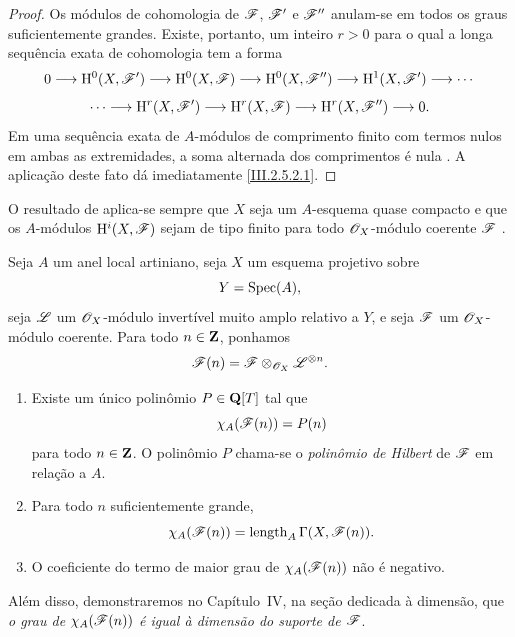 \begin{proof}
Os módulos de cohomologia de $\mathscr{F}$, $\mathscr{F}'$ e $\mathscr{F}''$ anulam-se em todos os graus suficientemente grandes.
Existe, portanto, um inteiro $r>0$ para o qual a longa sequência exata de cohomologia tem a forma
\[
  0\longrightarrow\mathrm{H}^0(X,\mathscr{F}')
  \longrightarrow\mathrm{H}^0(X,\mathscr{F})
  \longrightarrow\mathrm{H}^0(X,\mathscr{F}'')
  \longrightarrow\mathrm{H}^1(X,\mathscr{F}')
  \longrightarrow\cdots
\]
\[
  \cdots\longrightarrow\mathrm{H}^r(X,\mathscr{F}')
  \longrightarrow\mathrm{H}^r(X,\mathscr{F})
  \longrightarrow\mathrm{H}^r(X,\mathscr{F}'')
  \longrightarrow0.
\]
Em uma sequência exata de $A$-módulos de comprimento finito com termos nulos em ambas as extremidades, a soma alternada dos comprimentos é nula .
A aplicação deste fato dá imediatamente \eqref{III.2.5.2.1}.
\end{proof}

O resultado de  aplica-se sempre que $X$ seja um $A$-esquema quase compacto e que os $A$-módulos $\mathrm{H}^i(X,\mathscr{F})$ sejam de tipo finito para todo $\mathscr{O}_X$-módulo coerente $\mathscr{F}$ .

\begin{theorem}[2.5.3]
\label{III.2.5.3}
Seja $A$ um anel local artiniano, seja $X$ um esquema projetivo sobre
\[
  Y=\operatorname{Spec}(A),
\]
seja $\mathscr{L}$ um $\mathscr{O}_X$-módulo invertível muito amplo relativo a $Y$, e seja $\mathscr{F}$ um $\mathscr{O}_X$-módulo coerente.
Para todo $n\in\mathbf Z$, ponhamos
\[
  \mathscr{F}(n)=\mathscr{F}\otimes_{\mathscr{O}_X}\mathscr{L}^{\otimes n}.
\]
\begin{enumerate}
  \item[(i) ] Existe um único polinômio $P\in\mathbf Q[T]$ tal que
  \[
    \chi_A(\mathscr{F}(n))=P(n)
  \]
  para todo $n\in\mathbf Z$.
  O polinômio $P$ chama-se o \emph{polinômio de Hilbert} de $\mathscr{F}$ em relação a $A$.

  \item[(ii) ] Para todo $n$ suficientemente grande,
  \[
    \chi_A(\mathscr{F}(n))
    =
    \operatorname{length}_A\Gamma(X,\mathscr{F}(n)).
  \]

  \item[(iii)] O coeficiente do termo de maior grau de $\chi_A(\mathscr{F}(n))$ não é negativo.
\end{enumerate}
\end{theorem}

Além disso, demonstraremos no Capítulo~IV, na seção dedicada à dimensão, que \emph{o grau de $\chi_A(\mathscr{F}(n))$ é igual à dimensão do suporte de $\mathscr{F}$}.

